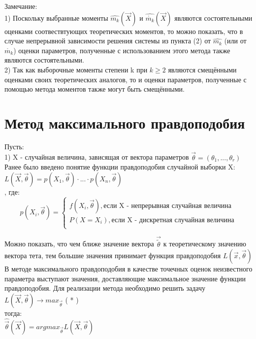 Замечание:\\
1) Поскольку выбранные моменты $\hat{m_{k}}(\overrightarrow{X})$ и $\hat{\mathring{m_{k}}}(\overrightarrow{X})$ являются состоятельными оценками соотвествтующих теоретических моментов, то можно показать, что в случае непрерывной зависимости решения системы из пункта (2) от $\hat{m_{k}}$ (или от $\mathring{m_{k}}$) оценки параметров, полученные с использованием этого метода также являются состоятельными.\\
2) Так как выборочные моменты степени k при $k \geqslant 2$ являются смещёнными оценками своих теоретических аналогов, то и оценки параметров, полученные с помощью метода моментов также могут быть смещёнными.

\section{Метод максимального правдоподобия}
Пусть:\\
1) X - случайная величина, зависящая от вектора параметров $\overrightarrow{\theta} = (\theta_{1}, ..., \theta_{r})$\\

Ранее было введено понятие функции правдоподобия случайной выборки X:\\
$L(\overrightarrow{X}, \overrightarrow{\theta}) = p(X_{1}, \overrightarrow{\theta}) \cdot ... \cdot p(X_{n}, \overrightarrow{\theta})$\\,
где:\\
\begin{equation}
p(X_{i}, \overrightarrow{\theta}) = 
\begin{cases}
f(X_{i}, \overrightarrow{\theta}), \text{если X - непрерывная случайная величина}\\
P(X = X_{i}), \text{если X - дискретная случайная величина}\\
\end{cases}
\end{equation}

Можно показать, что чем ближе значение вектора $\overrightarrow{\tilde{\theta}}$ к теоретическому значению вектора тета, тем большие значения принимает функция правдоподобия $L(\overrightarrow{x}, \overrightarrow{\theta})$\\

В методе максимального правдоподобия в качестве точечных оценок неизвестного параметра выступают значения, доставляющие максимальное значение функции правдоподобия. Для реализации метода необходимо решить задачу\\
$L(\overrightarrow{X},\overrightarrow{\theta}) \rightarrow max_{\overrightarrow{\theta}}$ ( * )\\
тогда:\\
$\hat{\overrightarrow{\theta}}(\overrightarrow{X}) = arg max_{\overrightarrow{\theta}} L(\overrightarrow{X}, \overrightarrow{\theta})$\\


